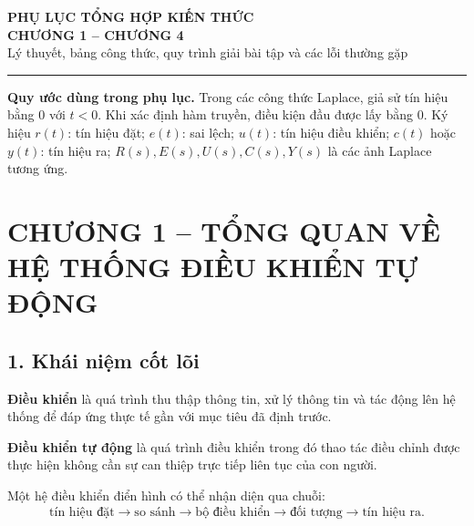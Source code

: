 %

\providecommand{\Lap}{\mathcal{L}}
\providecommand{\jj}{\mathrm{j}}

\clearpage
\begin{center}
{\LARGE\bfseries PHỤ LỤC TỔNG HỢP KIẾN THỨC}\\[0.25em]
{\Large\bfseries CHƯƠNG 1 -- CHƯƠNG 4}\\[0.45em]
{\small Lý thuyết, bảng công thức, quy trình giải bài tập và các lỗi thường gặp}
\end{center}
\hrule
\vspace{0.7em}

\noindent\textbf{Quy ước dùng trong phụ lục.}
Trong các công thức Laplace, giả sử tín hiệu bằng $0$ với $t<0$.
Khi xác định hàm truyền, điều kiện đầu được lấy bằng $0$.
Ký hiệu $r(t)$: tín hiệu đặt; $e(t)$: sai lệch; $u(t)$: tín hiệu điều khiển;
$c(t)$ hoặc $y(t)$: tín hiệu ra; $R(s),E(s),U(s),C(s),Y(s)$ là các ảnh Laplace tương ứng.

\clearpage
\section*{CHƯƠNG 1 -- TỔNG QUAN VỀ HỆ THỐNG ĐIỀU KHIỂN TỰ ĐỘNG}

\subsection*{1. Khái niệm cốt lõi}

\textbf{Điều khiển} là quá trình thu thập thông tin, xử lý thông tin và tác động lên hệ thống
để đáp ứng thực tế gần với mục tiêu đã định trước.

\textbf{Điều khiển tự động} là quá trình điều khiển trong đó thao tác điều chỉnh được thực hiện
không cần sự can thiệp trực tiếp liên tục của con người.

\medskip
\noindent Một hệ điều khiển điển hình có thể nhận diện qua chuỗi:
\[
\boxed{\text{tín hiệu đặt}}
\longrightarrow
\boxed{\text{so sánh}}
\longrightarrow
\boxed{\text{bộ điều khiển}}
\longrightarrow
\boxed{\text{đối tượng}}
\longrightarrow
\boxed{\text{tín hiệu ra}} .
\]

